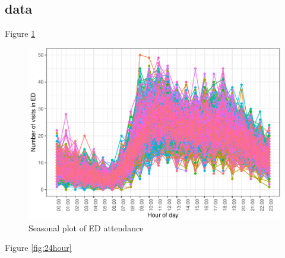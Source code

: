 \documentclass[]{elsarticle} %
\begin{document}
\hypertarget{data}{%
\subsection{data}\label{data}}

Figure \ref{fig:hourly-plot}

\begin{figure}[H]

{\centering \includegraphics[width=0.8\linewidth]{paper_files/figure-latex/hourly-plot-1} 

}

\caption{Seasonal plot of ED attendance}\label{fig:hourly-plot}
\end{figure}

Figure \ref{fig:24hour}
\end{document}
